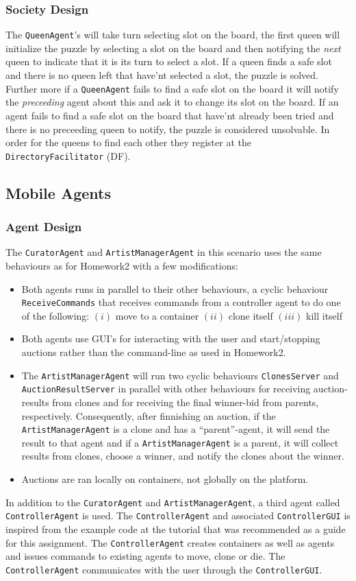 \documentclass[a4paper, 11pt]{article}
\begin{document}
\subsubsection*{Society Design}
The \texttt{QueenAgent}'s will take turn selecting slot on the board, the first queen will initialize the puzzle by selecting a slot on the board and then notifying the \textit{next} queen to indicate that it is its turn to select a slot. If a queen finds a safe slot and there is no queen left that have'nt selected a slot, the puzzle is solved. Further more if a \texttt{QueenAgent} fails to find a safe slot on the board it will notify the \textit{preceeding} agent about this and ask it to change its slot on the board. If an agent fails to find a safe slot on the board that have'nt already been tried and there is no preceeding queen to notify, the puzzle is considered unsolvable. In order for the queens to find each other they register at the \texttt{DirectoryFacilitator} (DF).
\subsection*{Mobile Agents}
\subsubsection*{Agent Design}
The \texttt{CuratorAgent} and \texttt{ArtistManagerAgent} in this scenario uses the same behaviours as for Homework2 with a few modifications:
\begin{itemize}
\item Both agents runs in parallel to their other behaviours, a cyclic behaviour \texttt{ReceiveCommands} that receives commands from a controller agent to do one of the following: $(i)$ move to a container $(ii)$ clone itself $(iii)$ kill itself
\item Both agents use GUI's for interacting with the user and start/stopping auctions rather than the command-line as used in Homework2.
\item The \texttt{ArtistManagerAgent} will run two cyclic behaviours \texttt{ClonesServer} and \texttt{AuctionResultServer} in parallel with other behaviours for receiving auction-results from clones and for receiving the final winner-bid from parents, respectively. Consequently, after finnishing an auction, if the \texttt{ArtistManagerAgent} is a clone and has a ``parent''-agent, it will send the result to that agent and if a \texttt{ArtistManagerAgent} is a parent, it will collect results from clones, choose a winner, and notify the clones about the winner.
\item Auctions are ran locally on containers, not globally on the platform.
\end{itemize}
In addition to the \texttt{CuratorAgent} and \texttt{ArtistManagerAgent}, a third agent called \texttt{ControllerAgent} is used. The \texttt{ControllerAgent} and associated \texttt{ControllerGUI} is inspired from the example code at the tutorial \citep{jade_tutorial2} that was recommended as a guide for this assignment. The \texttt{ControllerAgent} creates containers as well as agents and issues commands to existing agents to move, clone or die. The \texttt{ControllerAgent} communicates with the user through the \texttt{ControllerGUI}.
\end{document}
